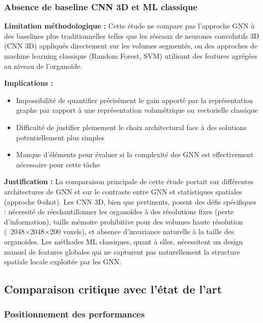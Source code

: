 \subsubsection{Absence de baseline CNN 3D et ML classique}

\textbf{Limitation méthodologique :}
Cette étude ne compare pas l'approche GNN à des baselines plus traditionnelles telles que les réseaux de neurones convolutifs 3D (CNN 3D) appliqués directement sur les volumes segmentés, ou des approches de machine learning classique (Random Forest, SVM) utilisant des features agrégées au niveau de l'organoïde.

\textbf{Implications :}
\begin{itemize}
    \item Impossibilité de quantifier précisément le gain apporté par la représentation graphe par rapport à une représentation volumétrique ou vectorielle classique
    \item Difficulté de justifier pleinement le choix architectural face à des solutions potentiellement plus simples
    \item Manque d'éléments pour évaluer si la complexité des GNN est effectivement nécessaire pour cette tâche
\end{itemize}

\textbf{Justification :}
La comparaison principale de cette étude portait sur différentes architectures de GNN et sur le contraste entre GNN et statistiques spatiales (approche 0-shot). Les CNN 3D, bien que pertinents, posent des défis spécifiques : nécessité de réechantillonner les organoïdes à des résolutions fixes (perte d'information), taille mémoire prohibitive pour des volumes haute résolution (~2048×2048×200 voxels), et absence d'invariance naturelle à la taille des organoïdes. Les méthodes ML classiques, quant à elles, nécessitent un design manuel de features globales qui ne capturent pas naturellement la structure spatiale locale exploitée par les GNN.

\subsection{Comparaison critique avec l'état de l'art}

\subsubsection{Positionnement des performances}

